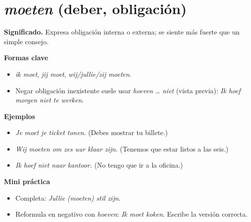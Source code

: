 \section{\textit{moeten} (deber, obligación)}
\textbf{Significado.} Expresa obligación interna o externa; se siente más fuerte que un simple consejo.

\textbf{Formas clave}
\begin{itemize}[leftmargin=*]
  \item \textit{ik moet}, \textit{jij moet}, \textit{wij/jullie/zij moeten}.
  \item Negar obligación inexistente suele usar \textit{hoeven \ldots{} niet} (vista previa): \textit{Ik hoef morgen niet te werken}.
\end{itemize}

\textbf{Ejemplos}
\begin{itemize}[leftmargin=*]
  \item \textit{Je moet je ticket tonen.} (Debes mostrar tu billete.)
  \item \textit{Wij moeten om zes uur klaar zijn.} (Tenemos que estar listos a las seis.)
  \item \textit{Ik hoef niet naar kantoor.} (No tengo que ir a la oficina.)
\end{itemize}

\textbf{Mini práctica}
\begin{itemize}[leftmargin=*]
  \item Completa: \textit{Jullie \underline{\hspace{1.2cm}}\underline{\hspace{1.2cm}}\underline{\hspace{1.2cm}} (moeten) stil zijn}.
  \item Reformula en negativo con \textit{hoeven}: \textit{Ik moet koken}. Escribe la versión correcta.
\end{itemize}

